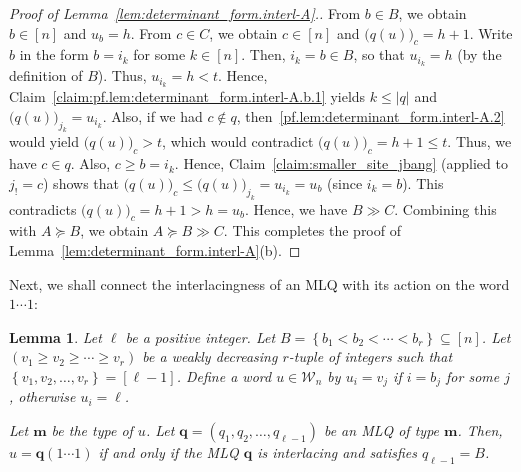 \documentclass[reqno]{amsart}
\newcommand{\0}{\phantom{c}}
\newcommand{\mm}{\mathbf{m}}
\newcommand{\qq}{\mathbf{q}}
\newcommand{\mcW}{\mathcal{W}}
\newcommand{\set}[1]{\left\{ #1 \right\}}
\newcommand{\abs}[1]{\left| #1 \right|}
\newcommand{\tup}[1]{\left( #1 \right)}
\newcommand{\ive}[1]{\left[ #1 \right]}
\theoremstyle{plain}
\newtheorem{lemma}[thm]{Lemma}
\theoremstyle{definition}
\numberwithin{equation}{section}
\newcommand{\Darij}[1]{\todo[size=\tiny,inline,color=red!30]{#1
      \\ \hfill --- Darij}}
\begin{document}
\begin{proof}[Proof of Lemma~\ref{lem:determinant_form.interl-A}.]
From $b\in B$, we obtain $b \in \ive{n}$ and $u_{b} = h$.
From $c\in C$, we obtain $c\in \ive{n}$ and $\bigl( q(u) \bigr)_{c} = h+1$.
Write $b$ in the form $b=i_k$ for some $k\in \ive{n}$.
Then, $i_k=b\in B$, so that $u_{i_k} = h$ (by the definition of $B$).
Thus, $u_{i_k} = h < t$.
Hence, Claim~\ref{claim:pf.lem:determinant_form.interl-A.b.1} yields $k \leq \abs{q}$ and $\bigl( q(u) \bigr)_{j_k} = u_{i_k}$.
Also, if we had $c\notin q$, then~\eqref{pf.lem:determinant_form.interl-A.2} would yield $\bigl( q(u) \bigr)_{c} > t$, which would contradict $\bigl( q(u) \bigr)_c = h + 1 \leq t$.
Thus, we have $c\in q$.
Also, $c \geq b = i_k$.
Hence, Claim~\ref{claim:smaller_site_jbang} (applied to $j_{!} = c$) shows that $\bigl( q(u) \bigr)_c \leq \bigl( q(u) \bigr)_{j_k} = u_{i_k} = u_{b}$ (since $i_k = b$).
This contradicts $\bigl( q(u) \bigr)_c = h + 1 > h = u_{b}$.
Hence, we have $B\gg C$.
Combining this with $A\succeq B$, we obtain $A \succeq B \gg C$.
This completes the proof of Lemma~\ref{lem:determinant_form.interl-A}(b).
\end{proof}

Next, we shall connect the interlacingness of an MLQ with its action on the word $1\dotsm 1$:

\begin{lemma}
\label{lem:determinant_form.interl-act}
Let $\ell$ be a positive integer. Let
$B = \set{ b_1 < b_2 < \cdots < b_r }  \subseteq \ive{n}$.
Let $\left( v_1 \geq v_2 \geq \dotsm \geq v_r \right)$ be a weakly decreasing $r$-tuple of integers such that $\set{ v_1, v_2, \dotsc, v_r } = \ive{\ell-1}$.
Define a word $u \in \mcW_n$ by $u_i = v_j$ if $i = b_j$ for some $j$, otherwise $u_i = \ell$.

Let $\mm$ be the type of $u$. Let $\qq = \tup{q_1, q_2, \dotsc, q_{\ell-1}}$ be an MLQ of type $\mm$.
Then, $u = \qq(1\dotsm 1)$ if and only if the MLQ $\qq$ is interlacing and satisfies $q_{\ell-1} = B$.
\end{lemma}

\Darij{TODO: Example.}
\end{document}
